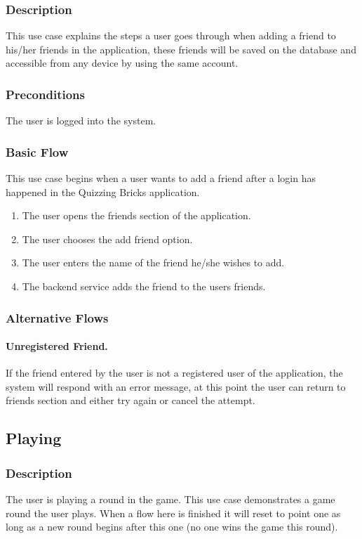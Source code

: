 \subsubsection{Description}
This use case explains the steps a user goes through when adding a friend to his/her friends in the application, these friends will be saved on the database and accessible from any device by using the same account.

\subsubsection{Preconditions}
The user is logged into the system.

\subsubsection{Basic Flow}
This use case begins  when a user wants to add a friend after a login has happened in the Quizzing Bricks application.
\begin{enumerate}
	\item The user opens the friends section of the application.
	\item The user chooses the add friend option.
	\item The user enters the name of the friend he/she wishes to add.
	\item The backend service adds the friend to the users friends.
\end{enumerate}

\subsubsection{Alternative Flows}
\paragraph{Unregistered Friend.}
If the friend entered by the user is not a registered user of the application, the system will respond with an error message, at this point the user can return to friends section and either try again or cancel the attempt.


\subsection{Playing}
\subsubsection{Description}
The user is playing a round in the game.
This use case demonstrates a game round the user plays. When a flow here is finished it will reset to point one as long as a new round begins after this one (no one wins the game this round).

